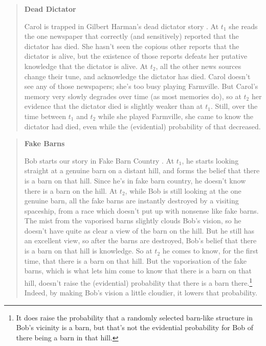 \begin{quote}
\textbf{Dead Dictator}

Carol is trapped in Gilbert Harman's dead dictator story \citep[75]{Harman1973}. At $t_1$ she reads the one newspaper that correctly (and sensitively) reported that the dictator has died. She hasn't seen the copious other reports that the dictator is alive, but the existence of those reports defeats her putative knowledge that the dictator is alive. At $t_2$, all the other news sources change their tune, and acknowledge the dictator has died. Carol doesn't see any of those newspapers; she's too busy playing Farmville. But Carol's memory very slowly degrades over time (as most memories do), so at $t_2$ her evidence that the dictator died is slightly weaker than at $t_1$. Still, over the time between $t_1$ and $t_2$ while she played Farmville, she came to know the dictator had died, even while the (evidential) probability of that decreased. 

\end{quote}

\begin{quote}
\textbf{Fake Barns}

Bob starts our story in Fake Barn Country \citep{Goldman1976}. At $t_1$, he starts looking straight at a genuine barn on a distant hill, and forms the belief that there is a barn on that hill. Since he's in fake barn country, he doesn't know there is a barn on the hill. At $t_2$, while Bob is still looking at the one genuine barn, all the fake barns are instantly destroyed by a visiting spaceship, from a race which doesn't put up with nonsense like fake barns. The mist from the vaporised barns slightly clouds Bob's vision, so he doesn't have quite as clear a view of the barn on the hill. But he still has an excellent view, so after the barns are destroyed, Bob's belief that there is a barn on that hill is knowledge. So at $t_2$ he comes to know, for the first time, that there is a barn on that hill. But the vaporisation of the fake barns, which is what lets him come to know that there is a barn on that hill, doesn't raise the (evidential) probability that there is a barn there.\footnote{It does raise the probability that a randomly selected barn-like structure in Bob's vicinity is a barn, but that's not the evidential probability for Bob of there being a barn in that hill.} Indeed, by making Bob's vision a little cloudier, it lowers that probability.
\end{quote}

